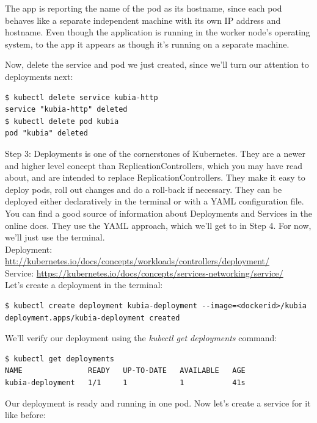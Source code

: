 \documentclass[a4paper,10pt]{article}
\begin{document}
The app is reporting the name of the pod as its hostname, since each pod behaves like a separate independent machine with its own IP address and hostname. Even though the application is running in the worker node's operating system, to the app it appears as though it's running on a separate machine.

Now, delete the service and pod we just created, since we'll turn our attention to deployments next:

\begin{lstlisting}[numbers=none, basicstyle=\mdseries]
$ kubectl delete service kubia-http
service "kubia-http" deleted
$ kubectl delete pod kubia
pod "kubia" deleted
\end{lstlisting}

Step 3: Deployments is one of the cornerstones of Kubernetes. They are a newer and higher level concept than ReplicationControllers, which you may have read about, and are intended to replace ReplicationControllers.  They make it easy to deploy pods, roll out changes and do a roll-back if necessary. They can be deployed either declaratively in the terminal or with a YAML configuration file. You can find a good source of information about Deployments and Services in the online docs. They use the YAML approach, which we'll get to in Step 4. For now, we'll just use the terminal. \\

Deployment: \url{htt://kubernetes.io/docs/concepts/workloads/controllers/deployment/} \\
Service: \url{https://kubernetes.io/docs/concepts/services-networking/service/} \\

Let's create a deployment in the terminal:

\begin{lstlisting}[numbers=none, basicstyle=\mdseries]
$ kubectl create deployment kubia-deployment --image=<dockerid>/kubia
deployment.apps/kubia-deployment created
\end{lstlisting}

We'll verify our deployment using the \textit{kubectl get deployments} command:

\begin{lstlisting}[numbers=none, basicstyle=\mdseries]
$ kubectl get deployments
NAME               READY   UP-TO-DATE   AVAILABLE   AGE
kubia-deployment   1/1     1            1           41s
\end{lstlisting}

Our deployment is ready and running in one pod. Now let's create a service for it like before:
\end{document}
